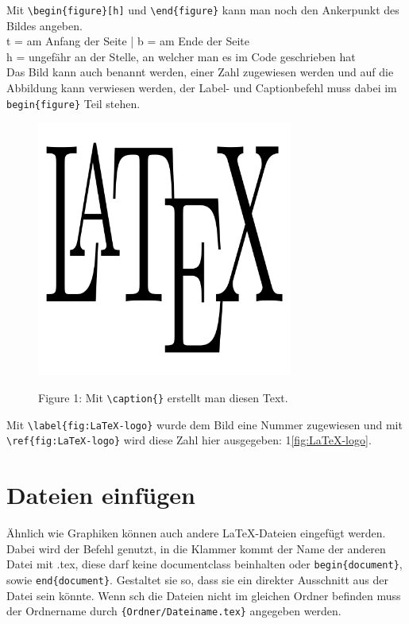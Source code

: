 \documentclass[ngerman]{scrreport}
\begin{document}
Mit {\color{blue}\verb|\begin{figure}[h]|} und {\color{blue}\verb|\end{figure}|} kann man noch den Ankerpunkt des Bildes angeben.\\
{\color{blue}t} = am Anfang der Seite  |  {\color{blue}b} = am Ende der Seite \\
{\color{blue}h} = ungefähr an der Stelle, an welcher man es im Code geschrieben hat\\
\vspace{0.5cm}
Das Bild kann auch benannt werden, einer Zahl zugewiesen werden und auf die Abbildung kann verwiesen werden, der Label- und Captionbefehl muss dabei im {\color{blue}\verb|begin{figure}|} Teil stehen.\\
\graphicspath{{resources/}}
\begin{figure}[h]
\centering
\includegraphics[width=0.75\textwidth]{LaTeX-logo}
\begin{center}Figure 1: Mit {\color{blue}\verb|\caption{}|} erstellt man diesen Text.\end{center}
\end{figure}
\raggedright
\label{fig:LaTeX-logo}
Mit {\color{blue}\verb|\label{fig:LaTeX-logo}|} wurde dem Bild eine Nummer zugewiesen und mit {\color{blue}\verb|\ref{fig:LaTeX-logo}|} wird diese Zahl hier ausgegeben: 1\ref{fig:LaTeX-logo}.\\

\section{Dateien einfügen}
Ähnlich wie Graphiken können auch andere \LaTeX{}-Dateien eingefügt werden. Dabei wird der Befehl {\color{blue}\verb||} genutzt, in die Klammer kommt der Name der anderen Datei mit .tex, diese darf keine {\color{blue}documentclass} beinhalten oder {\color{blue}\verb|begin{document}|}, sowie {\color{blue}\verb|end{document}|}. Gestaltet sie so, dass sie ein direkter Ausschnitt aus der Datei sein könnte. Wenn sch die Dateien nicht im gleichen Ordner befinden muss der Ordnername durch {\color{blue}\verb|{Ordner/Dateiname.tex}|} angegeben werden.
\end{document}
